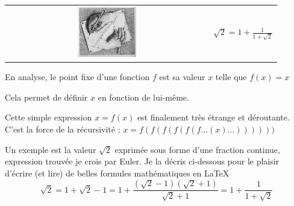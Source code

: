\documentclass[11pt]{book}
\begin{document}
\begin{center}
 \begin{tabular}{cc}
	\parbox[c]{0.3\textwidth}{\includegraphics[width=0.3\textwidth]{DrawingHands.jpg}}
  & \hspace{0.5cm}
   $\sqrt{2} = 1 + \frac{1}{1+\sqrt{2}} $  \\
 \end{tabular}
\end{center}



En analyse, le point fixe d'une fonction $f$ est sa valeur $x$ telle que $f(x)=x$

Cela permet de d\'{e}finir $x$ en fonction de lui-m\^{e}me.

Cette simple expression $x=f(x)$ est finalement tr\`{e}s \'{e}trange et d\'{e}routante.
C'est la force de la r\'{e}cursivit\'{e} : $x=f(f(f(f(f(f\ldots (x)\ldots))))))$

Un exemple est la valeur $\sqrt{2}$ exprim\'{e}e sous forme d'une fraction continue,
expression trouv\'{e}e je crois par Euler.
Je la d\'{e}cris ci-dessous  pour le plaisir d'\'{e}crire (et lire) de belles formules math\'{e}matiques en \LaTeX
\cite{lamport1994latex}
$$
\sqrt{2} = 1+\sqrt{2} -1
= 1+ \frac{(\sqrt{2} -1)(\sqrt{2} +1)}{\sqrt{2} +1}
= 1 + \frac{1}{1+\sqrt{2}}
$$


\end{document}
